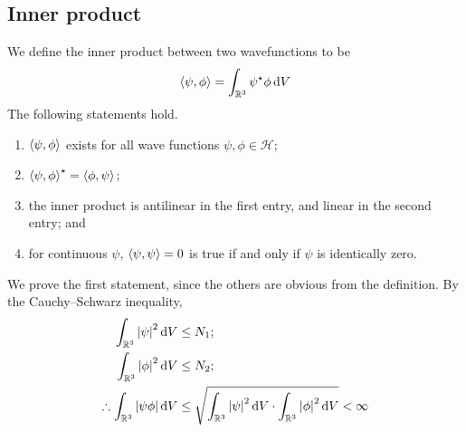 \subsection{Inner product}
We define the inner product between two wavefunctions to be
\[
	\left\langle{\psi,\phi}\right\rangle = \int_{\mathbb R^3} \psi^\star \phi \dd{V}
\]
The following statements hold.
\begin{enumerate}
	\item \( \left\langle{\psi, \phi}\right\rangle \) exists for all wave functions \( \psi, \phi \in \mathcal H \);
	\item \( \left\langle{\psi, \phi}\right\rangle^\star = \left\langle{\phi, \psi}\right\rangle \);
	\item the inner product is antilinear in the first entry, and linear in the second entry; and
	\item for continuous \( \psi \), \( \left\langle{\psi, \psi}\right\rangle = 0 \) is true if and only if \( \psi \) is identically zero.
\end{enumerate}
We prove the first statement, since the others are obvious from the definition.
By the Cauchy--Schwarz inequality,
\begin{align*}
	\int_{\mathbb R^3} \abs{\psi}^2 \dd{V}               & \leq N_1;                                                                                                \\
	\int_{\mathbb R^3} \abs{\phi}^2 \dd{V}               & \leq N_2;                                                                                                \\
	\therefore \int_{\mathbb R^3} \abs{\psi \phi} \dd{V} & \leq \sqrt{\int_{\mathbb R^3} \abs{\psi}^2 \dd{V} \cdot \int_{\mathbb R^3} \abs{\phi}^2 \dd{V}} < \infty \\
\end{align*}

